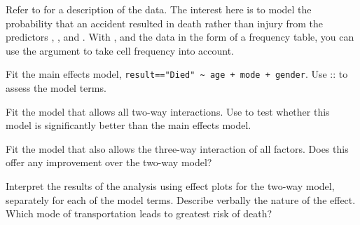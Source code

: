 \documentclass[11pt]{report}\usepackage[]{graphicx}\usepackage[]{color}
\begin{document}
\begin{Exercises}

\exercise Refer to  for a description of the  data.  The interest here
is to model the probability that an accident resulted in death rather than injury from the predictors
, , and .  With , and the data in the form of a frequency table,
you can use the argument  to take cell frequency into account.
  \begin{enumerate*}
    \begin{sloppypar}
    \item Fit the main effects model, \verb|result=="Died" ~ age + mode + gender|.  Use ::
    to assess the model terms.
    \end{sloppypar}
    \item Fit the model that allows all two-way interactions.  Use  to test whether this model is
    significantly better than the main effects model.
    \item Fit the model that also allows the three-way interaction of all factors.  Does this offer any improvement
    over the two-way model?
    \item Interpret the results of the analysis using effect plots for the two-way model, separately for each of
    the model terms. Describe verbally the nature of the  effect. 
    Which mode of transportation leads to greatest risk of death?
  \end{enumerate*}


\end{Exercises}
\end{document}

